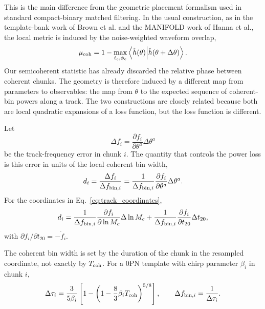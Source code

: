This is the main difference from the geometric placement formalism used in
standard compact-binary matched filtering.  In the usual construction, as in
the template-bank work of Brown et al. and the MANIFOLD work of Hanna et al.,
the local metric is induced by the noise-weighted waveform overlap,
\begin{equation}
    \mu_{\rm coh}
    =
    1
    -
    \max_{t_c,\phi_c}
    \left<
        \hat h(\theta)
        \middle|
        \hat h(\theta+\Delta\theta)
    \right> .
    \label{eq:coherent_waveform_mismatch}
\end{equation}
Our semicoherent statistic has already discarded the relative phase between
coherent chunks.  The geometry is therefore induced by a different map from
parameters to observables: the map from $\theta$ to the expected sequence of
coherent-bin powers along a track.  The two constructions are closely related
because both are local quadratic expansions of a loss function, but the loss
function is different.

Let
\begin{equation}
    \Delta f_i
    =
    \frac{\partial f_i}{\partial\theta^a}\Delta\theta^a
\end{equation}
be the track-frequency error in chunk $i$.  The quantity that controls the
power loss is this error in units of the local coherent bin width,
\begin{equation}
    d_i
    =
    \frac{\Delta f_i}{\Delta f_{{\rm bin},i}}
    =
    \frac{1}{\Delta f_{{\rm bin},i}}
    \frac{\partial f_i}{\partial\theta^a}\Delta\theta^a .
    \label{eq:semicoherent_bin_offset}
\end{equation}
For the coordinates in Eq.~\eqref{eq:track_coordinates},
\begin{equation}
    d_i
    =
    \frac{1}{\Delta f_{{\rm bin},i}}
    \frac{\partial f_i}{\partial \ln M_c}\Delta\ln M_c
    +
    \frac{1}{\Delta f_{{\rm bin},i}}
    \frac{\partial f_i}{\partial t_{20}}\Delta t_{20},
    \label{eq:semicoherent_bin_offset_coordinates}
\end{equation}
with $\partial f_i/\partial t_{20}=-\dot f_i$.

The coherent bin width is set by the duration of the chunk in the resampled
coordinate, not exactly by $T_{\rm coh}$.  For a 0PN template with chirp
parameter $\beta_i$ in chunk $i$,
\begin{equation}
    \Delta \tau_i
    =
    \frac{3}{5\beta_i}
    \left[
        1
        -
        \left(1-\frac{8}{3}\beta_i T_{\rm coh}\right)^{5/8}
    \right],
    \qquad
    \Delta f_{{\rm bin},i} = \frac{1}{\Delta\tau_i}.
    \label{eq:tau_bin_width}
\end{equation}

